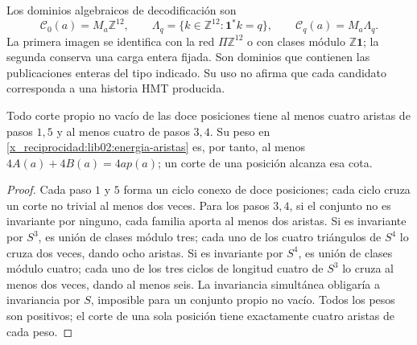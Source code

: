 Los dominios algebraicos de decodificación son
\[
 \mathcal C_0(a)=M_a\mathbb Z^{12},\qquad
 \Lambda_q=\{k\in\mathbb Z^{12}:\mathbf1^*k=q\},\qquad
 \mathcal C_q(a)=M_a\Lambda_q.
\]
La primera imagen se identifica con la red \(\Pi\mathbb Z^{12}\)
o con clases módulo \(\mathbb Z\mathbf1\); la segunda conserva una
carga entera fijada. Son dominios que contienen las publicaciones enteras
del tipo indicado. Su uso no afirma que cada candidato corresponda a una
historia HMT producida.

\begin{lemma}
\label{x_reciprocidad:lib02:cortes}
Todo corte propio no vacío de las doce posiciones tiene al menos cuatro
aristas de pasos \(1,5\) y al menos cuatro de pasos \(3,4\). Su peso
en \eqref{x_reciprocidad:lib02:energia-aristas} es, por tanto, al menos
\(4A(a)+4B(a)=4ap(a)\); un corte de una posición alcanza esa cota.
\end{lemma}
\begin{proof}
Cada paso \(1\) y \(5\) forma un ciclo conexo de doce posiciones;
cada ciclo cruza un corte no trivial al menos dos veces. Para los pasos
\(3,4\), si el conjunto no es invariante por ninguno, cada familia
aporta al menos dos aristas. Si es invariante por \(S^3\), es unión
de clases módulo tres; cada uno de los cuatro triángulos de \(S^4\)
lo cruza dos veces, dando ocho aristas. Si es invariante por \(S^4\),
es unión de clases módulo cuatro; cada uno de los tres ciclos de longitud
cuatro de \(S^3\) lo cruza al menos dos veces, dando al menos seis.
La invariancia simultánea obligaría a invariancia por \(S\), imposible
para un conjunto propio no vacío. Todos los pesos son positivos; el
corte de una sola posición tiene exactamente cuatro aristas de cada
peso.
\end{proof}

